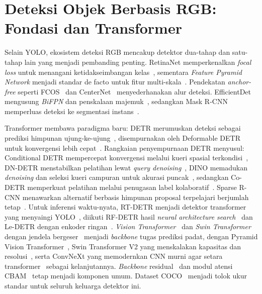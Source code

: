 \documentclass[11pt,a4paper]{article}
\begin{document}
\section{Deteksi Objek Berbasis RGB: Fondasi dan Transformer}
Selain YOLO, ekosistem deteksi RGB mencakup detektor dua-tahap dan satu-tahap
lain yang menjadi pembanding penting. RetinaNet memperkenalkan \emph{focal loss}
untuk menangani ketidakseimbangan kelas~\cite{lin2017focal}, sementara
\emph{Feature Pyramid Network} menjadi standar de facto untuk fitur
multi-skala~\cite{lin2017fpn}. Pendekatan \emph{anchor-free} seperti
FCOS~\cite{tian2019fcos} dan CenterNet~\cite{zhou2019objects} menyederhanakan
alur deteksi. EfficientDet mengusung \emph{BiFPN} dan penskalaan
majemuk~\cite{tan2020efficientdet}, sedangkan Mask R-CNN memperluas deteksi ke
segmentasi instans~\cite{he2017maskrcnn}.

Transformer membawa paradigma baru: DETR merumuskan deteksi sebagai prediksi
himpunan ujung-ke-ujung~\cite{carion2020detr}, disempurnakan oleh Deformable
DETR untuk konvergensi lebih cepat~\cite{zhu2021deformabledetr}. Rangkaian
penyempurnaan DETR menyusul: Conditional DETR mempercepat konvergensi melalui
kueri spasial terkondisi~\cite{meng2021conditionaldetr}, DN-DETR menstabilkan
pelatihan lewat \emph{query denoising}~\cite{li2022dndetr}, DINO memadukan
\emph{denoising} dan seleksi kueri campuran untuk akurasi
puncak~\cite{zhang2023dino}, sedangkan Co-DETR memperkuat pelatihan melalui
penugasan label kolaboratif~\cite{zong2023codetr}. Sparse R-CNN menawarkan
alternatif berbasis himpunan proposal terpelajari berjumlah
tetap~\cite{sun2021sparsercnn}. Untuk inferensi waktu-nyata, RT-DETR menjadi
detektor transformer yang menyaingi YOLO~\cite{zhao2024rtdetr}, diikuti RF-DETR
hasil \emph{neural architecture search}~\cite{robinson2025rfdetr} dan Le-DETR
dengan enkoder ringan~\cite{huang2026ledetr}. \emph{Vision
Transformer}~\cite{dosovitskiy2021vit} dan \emph{Swin Transformer} dengan jendela
bergeser~\cite{liu2021swin} menjadi \emph{backbone} tugas prediksi padat, dengan
Pyramid Vision Transformer~\cite{wang2021pvt}, Swin Transformer V2 yang
menskalakan kapasitas dan resolusi~\cite{liu2022swinv2}, serta ConvNeXt yang
memodernkan CNN murni agar setara transformer~\cite{liu2022convnext} sebagai
kelanjutannya. \emph{Backbone} residual~\cite{he2016resnet} dan modul atensi
CBAM~\cite{woo2018cbam} tetap menjadi komponen umum. Dataset COCO~\cite{lin2014coco}
menjadi tolok ukur standar untuk seluruh keluarga detektor ini.
\end{document}
